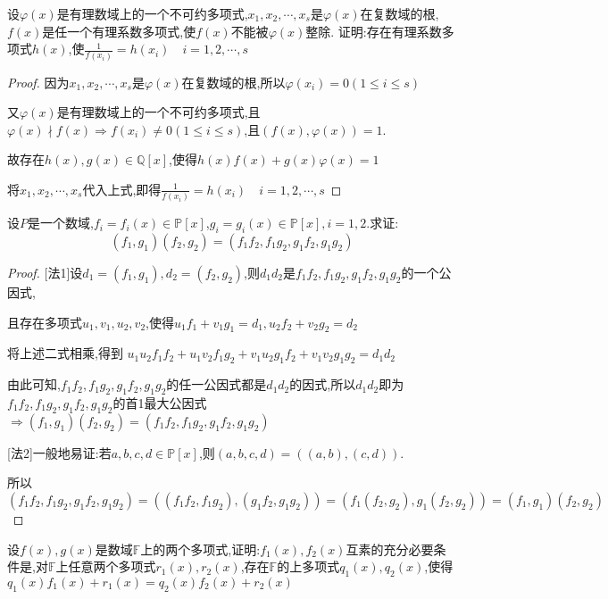 \begin{example}
    
    设$\varphi (x)$是有理数域上的一个不可约多项式,$x_1,x_2,\cdots,x_s$是$\varphi(x)$在复数域的根,$f(x)$是任一个有理系数多项式,使$f(x)$不能被$\varphi(x)$整除. 证明:存在有理系数多项式$h(x)$,使$\frac{1}{f(x_i)}=h(x_i)\quad i=1,2,\cdots,s$
\end{example}

\begin{proof}
    
    因为$x_1,x_2,\cdots,x_s$是$\varphi(x)$在复数域的根,所以$\varphi(x_i)=0(1\le i\le s)$

    又$\varphi(x)$是有理数域上的一个不可约多项式,且$\varphi(x)\nmid f(x) \Longrightarrow f(x_i)\ne 0(1\le i\le s)$,且$(f(x),\varphi(x))=1$.
    
    故存在$h(x),g(x)\in \mathbb{Q}[x]$,使得$h(x)f(x)+g(x)\varphi(x)=1$

    将$x_1,x_2,\cdots,x_s$代入上式,即得$\frac{1}{f(x_i)}=h(x_i)\quad i=1,2,\cdots,s$
\end{proof}

\begin{example}
    设$P$是一个数域,$f_i=f_i(x)\in \mathbb{P}[x]$,$g_i=g_i(x)\in \mathbb{P}[x],i=1,2. $求证:
    $$(f_1,g_1)(f_2,g_2)=(f_1f_2,f_1g_2,g_1f_2,g_1g_2)$$
\end{example}

\begin{proof}
    
    [法1]设$d_1=(f_1,g_1),d_2=(f_2,g_2)$,则$d_1d_2$是$f_1f_2,f_1g_2,g_1f_2,g_1g_2$的一个公因式,
    
    且存在多项式$u_1,v_1,u_2,v_2$,使得$u_1f_1+v_1g_1=d_1,u_2f_2+v_2g_2=d_2$

    将上述二式相乘,得到
    $u_1u_2f_1f_2+u_1v_2f_1g_2+v_1u_2g_1f_2+v_1v_2g_1g_2=d_1d_2$

    由此可知,$f_1f_2,f_1g_2,g_1f_2,g_1g_2$的任一公因式都是$d_1d_2$的因式,所以$d_1d_2$即为$f_1f_2,f_1g_2,g_1f_2,g_1g_2$的首1最大公因式$\Longrightarrow (f_1,g_1)(f_2,g_2)=(f_1f_2,f_1g_2,g_1f_2,g_1g_2)$

    [法2]一般地易证:若$a,b,c,d\in \mathbb{P}[x]$,则$(a,b,c,d)=((a,b),(c,d))$. 

    所以$(f_1f_2,f_1g_2,g_1f_2,g_1g_2)=((f_1f_2,f_1g_2),(g_1f_2,g_1g_2))
    =(f_1(f_2,g_2),g_1(f_2,g_2))
    =(f_1,g_1)(f_2,g_2)$
\end{proof}

\begin{example}\label{例题1.2.19}
    设$f(x),g(x)$是数域$\mathbb{F}$上的两个多项式,证明:$f_1(x),f_2(x)$互素的充分必要条件是,对$\mathbb{F}$上任意两个多项式$r_1(x),r_2(x)$,存在$\mathbb{F}$的上多项式$q_1(x),q_2(x)$,使得$q_1(x)f_1(x)+r_1(x)=q_2(x)f_2(x)+r_2(x)$
\end{example}

